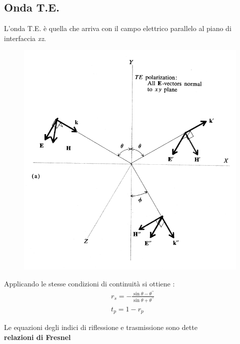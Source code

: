 \subsection{Onda T.E.}
L'onda T.E. è quella che arriva con il campo elettrico parallelo al piano di interfaccia \textit{xz}.
\begin{figure}[!h]
    \centering
    \includegraphics[scale=0.4]{riflessione/OndaTE}
\end{figure}
Applicando le stesse condizioni di continuità si ottiene : 
\begin{align*}
    &r_{s} = -\frac{\sin{\theta-\theta^{\prime\prime}}}{\sin{\theta+\theta^{\prime\prime}}} \\[1em]
    &t_{p} = 1-r_{p}
\end{align*}
\begin{tcolorbox}[colback=red!5!white,colframe=red!50!black,title=ATTENZIONE !]
        Le equazioni degli indici di riflessione e trasmissione sono dette \\ \textbf{relazioni di Fresnel}
\end{tcolorbox}
\newpage
